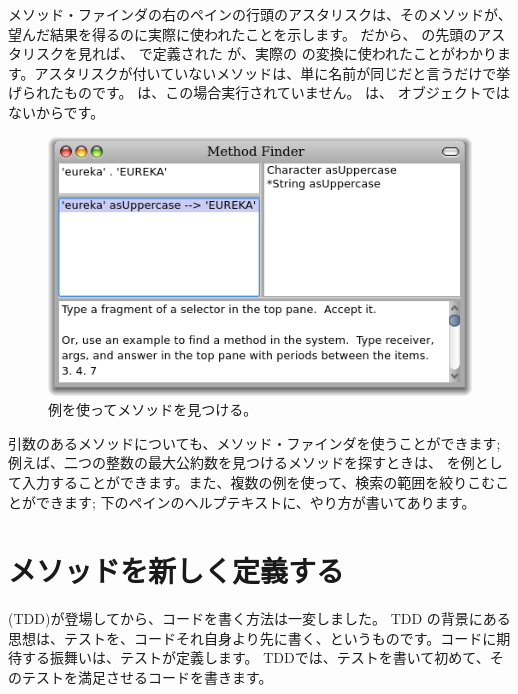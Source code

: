 \documentclass[a4paper,10pt,twoside]{book}
\begin{document}
メソッド・ファインダの右のペインの行頭のアスタリスクは、そのメソッドが、望んだ結果を得るのに実際に使われたことを示します。
だから、 の先頭のアスタリスクを見れば、 で定義された  が、実際の  の変換に使われたことがわかります。アスタリスクが付いていないメソッドは、単に名前が同じだと言うだけで挙げられたものです。 は、この場合実行されていません。 は、 オブジェクトではないからです。

\begin{figure}[hbt]
\centerline {\includegraphics[width=\textwidth]{MethodFinder-example1}}
\caption{例を使ってメソッドを見つける。
}
\end{figure}

引数のあるメソッドについても、メソッド・ファインダを使うことができます; 例えば、二つの整数の最大公約数を見つけるメソッドを探すときは、 を例として入力することができます。また、複数の例を使って、検索の範囲を絞りこむことができます; 下のペインのヘルプテキストに、やり方が書いてあります。

\section{メソッドを新しく定義する}

\cite{Beck03a} (TDD)が登場してから、コードを書く方法は一変しました。
TDD の背景にある思想は、テストを、コードそれ自身より先に書く、というものです。コードに期待する振舞いは、テストが定義します。
TDDでは、テストを書いて初めて、そのテストを満足させるコードを書きます。
\end{document}
